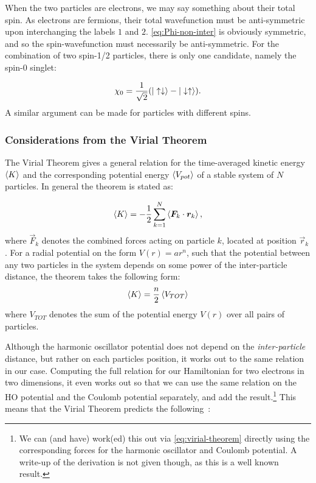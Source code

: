 \documentclass[Thesis.tex]{subfiles}
\begin{document}
When the two particles are electrons, we may say something about their total
spin. As electrons are fermions, their total wavefunction must be
anti-symmetric upon interchanging the labels $1$ and $2$.
\autoref{eq:Phi-non-inter} is obviously symmetric, and so the
spin-wavefunction must necessarily be anti-symmetric. For the combination of
two spin-1/2 particles, there is only one candidate, namely the spin-0
singlet:

\begin{align}
    \chi_0 = \frac{1}{\sqrt 2}\qty(| \uparrow\downarrow \rangle -
    | \downarrow\uparrow \rangle).
\end{align}
A similar argument can be made for particles with different spins.

\subsubsection{Considerations from the Virial Theorem}

The Virial Theorem gives a general relation for the time-averaged kinetic
energy $\expval{K}$ and the corresponding potential energy
$\expval{V_{pot}}$ of a stable system of $N$ particles. In general the
theorem is stated as:

\begin{align}
    \expval{K} = -\frac{1}{2}\sum_{k=1}^N \expval{\bm{F}_k \cdot \bm{r}_k},\label{eq:virial-theorem}
\end{align}
where $\vec F_k$ denotes the combined forces acting on particle $k$, located
at position $\vec r_k$. For a radial potential on the form $V(r)=ar^n$, such
that the potential between any two particles in the system depends on some
power of the inter-particle distance, the
theorem takes the following form:
\begin{align}
    \expval{K} = \frac{n}{2}\expval{V_{TOT}}
\end{align}
where $V_{TOT}$ denotes the sum of the potential energy $V(r)$ over all
pairs of particles. 

Although the harmonic oscillator potential does not depend on the
\emph{inter-particle} distance, but rather on each particles position, it
works out to the same relation in our case. Computing the full relation for
our Hamiltonian for two electrons in two dimensions, it even works out so
that we can use the same relation on the HO potential and the Coulomb
potential separately, and add the result.\footnote{We can (and have) work(ed) this out
via \autoref{eq:virial-theorem} directly using the corresponding forces for
the harmonic oscillator and Coulomb potential. A write-up of the derivation is not given
though, as this is a well known result.} This means that the Virial Theorem
predicts the following~\cite{Katriel2012}:
\end{document}

